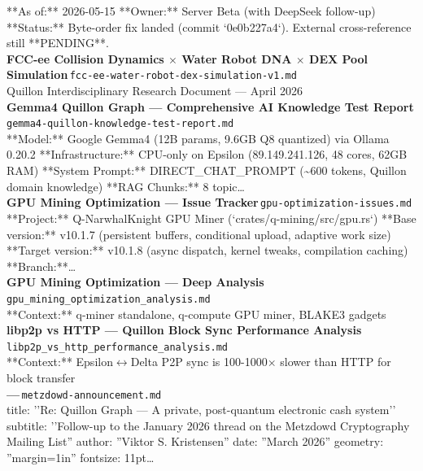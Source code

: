 \documentclass[11pt,a4paper]{article}
\begin{document}
**As of:** 2026-05-15 **Owner:** Server Beta (with DeepSeek follow-up) **Status:** Byte-order fix landed (commit `0e0b227a4`). External cross-reference still **PENDING**.\\[6pt]
\noindent\textbf{FCC-ee Collision Dynamics $\times$ Water Robot DNA $\times$ DEX Pool Simulation}\,\textcolor{qgray}{\small \texttt{fcc-ee-water-robot-dex-simulation-v1.md}}\\
Quillon Interdisciplinary Research Document --- April 2026\\[6pt]
\noindent\textbf{Gemma4 Quillon Graph --- Comprehensive AI Knowledge Test Report}\,\textcolor{qgray}{\small \texttt{gemma4-quillon-knowledge-test-report.md}}\\
**Model:** Google Gemma4 (12B params, 9.6GB Q8 quantized) via Ollama 0.20.2 **Infrastructure:** CPU-only on Epsilon (89.149.241.126, 48 cores, 62GB RAM) **System Prompt:** DIRECT\_CHAT\_PROMPT (\textasciitilde{}600 tokens, Quillon domain knowledge) **RAG Chunks:** 8 topic\ldots{}\\[6pt]
\noindent\textbf{GPU Mining Optimization --- Issue Tracker}\,\textcolor{qgray}{\small \texttt{gpu-optimization-issues.md}}\\
**Project:** Q-NarwhalKnight GPU Miner (`crates/q-mining/src/gpu.rs`) **Base version:** v10.1.7 (persistent buffers, conditional upload, adaptive work size) **Target version:** v10.1.8 (async dispatch, kernel tweaks, compilation caching) **Branch:**\ldots{}\\[6pt]
\noindent\textbf{GPU Mining Optimization --- Deep Analysis}\,\textcolor{qgray}{\small \texttt{gpu\_mining\_optimization\_analysis.md}}\\
**Context:** q-miner standalone, q-compute GPU miner, BLAKE3 gadgets\\[6pt]
\noindent\textbf{libp2p vs HTTP --- Quillon Block Sync Performance Analysis}\,\textcolor{qgray}{\small \texttt{libp2p\_vs\_http\_performance\_analysis.md}}\\
**Context:** Epsilon$\leftrightarrow$Delta P2P sync is 100-1000$\times$ slower than HTTP for block transfer\\[6pt]
\noindent\textbf{---}\,\textcolor{qgray}{\small \texttt{metzdowd-announcement.md}}\\
title: ''Re: Quillon Graph --- A private, post-quantum electronic cash system'' subtitle: ''Follow-up to the January 2026 thread on the Metzdowd Cryptography Mailing List'' author: ''Viktor S. Kristensen'' date: ''March 2026'' geometry: ''margin=1in'' fontsize: 11pt\ldots{}\\[6pt]
\end{document}
